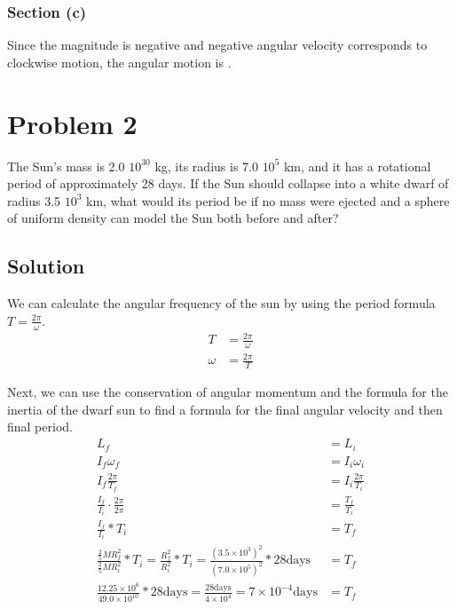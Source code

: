 \documentclass[12pt]{article}
\begin{document}
\subsubsection{Section (c)}
Since the magnitude is negative and negative angular velocity corresponds to clockwise motion, the angular motion is .

\pagebreak
\section{Problem 2}
The Sun's mass is 2.0 \texttimes $10^{30}$ kg, its radius is 7.0 \texttimes $10^5$ km, and it has a rotational period of approximately 28 days. If the Sun should collapse into a white dwarf of radius 3.5 \texttimes $10^3$ km, what would its period be if no mass were ejected and a sphere of uniform density can model the Sun both before and after?

\subsection{Solution}

We can calculate the angular frequency of the sun by using the period formula \(T = \frac{2\pi}{\omega}\).
\begin{align}
    T   &=  \frac{2\pi}{\omega}\\
    \omega  &=  \frac{2\pi}{T}
\end{align}

Next, we can use the conservation of angular momentum and the formula for the inertia of the dwarf sun to find a formula for the final angular velocity and then final period.
\begin{align}
    L_f &=  L_i\\
    I_f\omega_f &=  I_i\omega_i\\
    I_f\frac{2\pi}{T_f} &=  I_i\frac{2\pi}{T_i}\\
    \frac{I_f}{I_i}\cdot\frac{2\pi}{2\pi}   &=  \frac{T_f}{T_i}\\
    \frac{I_f}{I_i}*T_i &=  T_f\\
    \frac{\frac{2}{5}MR_f^2}{\frac{2}{5}MR_i^2}*T_i =
    \frac{R_f^2}{R_i^2}*T_i =
    \frac{(3.5 \times 10^{3})^2}{(7.0 \times 10^{5})^2}*28\text{days}   &=  T_f\\
    \frac{12.25 \times 10^{6}}{49.0 \times 10^{10}}*28\text{days}   =
    \frac{28\text{days}}{4 \times 10^4} =
    7 \times 10^{-4} \text{days}    &=  T_f
\end{align}
\end{document}
